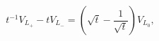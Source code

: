 \begin{equation}
t^{-1}V_{L_{+}}-tV_{L_{-}}=(\sqrt{t}-\frac{1}{\sqrt{t}})V_{L_{0}},
\label{36}
\end{equation}

